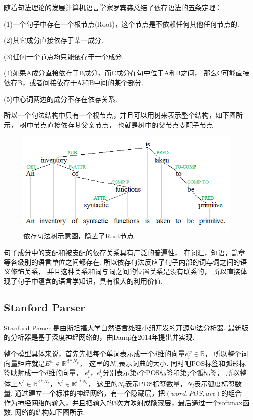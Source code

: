 \documentclass[bachelor,adobefonts]{jnuthesis}
\begin{document}
随着句法理论的发展计算机语言学家罗宾森总结了依存语法的五条定理：

(1)一个句子中存在一个根节点(Root)，这个节点是不依赖任何其他任何节点的.

(2)其它成分直接依存于某一成分.

(3)任何一个节点均只能依存于一个成分.

(4)如果A成分直接依存于B成分，而C成分在句中位于A和B之间，
那么C可能直接依存B，或者间接依存于A和B中间的某个部分.

(5)中心词两边的成分不存在依存关系.

所以一个句法结构中只有一个根节点，并且可以用树来表示整个结构，如下图所示，
树中节点直接依存其父亲节点，
也就是树中的父节点支配子节点.

\begin{figure}[h!]
  \centering
  \includegraphics[width=0.6\linewidth]{yicunjufashu.png}
  \caption{依存句法树示意图，隐去了Root节点}
\end{figure}

句子成分中的支配和被支配的依存关系具有广泛的普遍性，
在词汇，短语，篇章等各级别的语言单位之间都存在.
所以依存句法反应了句子内部的词与词之间的语义修饰关系，
并且这种关系和词与词之间的位置关系是没有联系的，
所以直接体现了句子中蕴含的语言学知识，具有很大的利用价值.

\subsection{Stanford Parser}
Stanford Parser 是由斯坦福大学自然语言处理小组开发的开源句法分析器.
最新版的分析器是基于深度神经网络的，由Danqi在2014年提出并实现\cite{The}.

整个模型具体来说，首先先把每个单词表示成一个$d$维的向量$e_{i}^{w} \in \mathbb{R}$，
所以整个词向量矩阵就是$E^{w} \in \mathbb{R}^{d*N_{w}}$，
这里的$N_{w}$表示词典的大小.
同时吧POS标签和弧形标签映射成一个$d$维的向量，
$e^{t}_{i}$，$e^{l}_{j}$分别表示第$i$个POS标签和第$j$个弧标签，
所以整体上$E^{t} \in \mathbb{R}^{d*N_{t}}$，$E^{l} \in \mathbb{R}^{d*N_{l}}$，
这里的$N_{t}$表示POS标签数量，$N_{l}$表示弧度标签数量.
通过建立一个标准的神经网络，有一个隐藏层，把$(word,POS,arc)$的组合
作为神经网络的输入，并且把输入的3次方映射成隐藏层，最后通过一个softmax函数.
网络的结构如下图所示.
\end{document}
